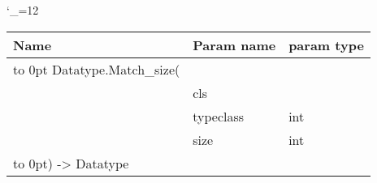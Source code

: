 \begingroup \catcode`\_=12 \tt
\begin{tabular}{lll}
\toprule
\textrm{Name}&\textrm{Param name}&\textrm{param type}\\
\midrule
\hbox to 0pt {Datatype.Match_size(\hss}\\
& cls\\
& typeclass & int\\
& size & int\\
\hbox to 0pt{) -> Datatype\hss}\\
\bottomrule
\end{tabular}
\endgroup
